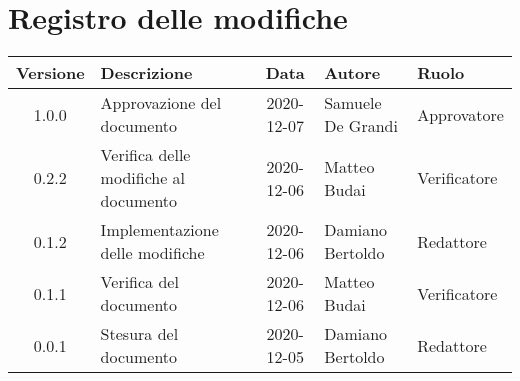 \section*{Registro delle modifiche}

\begin{center}
	\begin{longtable}{|c|p{3.5cm}|c|p{3.1cm}|p{3cm}|}
	\hline
	\rowcolor{lighter-grayer}
	\textbf{Versione} & \textbf{Descrizione} & \textbf{Data} & \textbf{Autore} & \textbf{Ruolo} \\
	\hline
	\endfirsthead

	1.0.0 & Approvazione del documento & 2020-12-07 & Samuele De Grandi & Approvatore \\
	\hline
	0.2.2 & Verifica delle modifiche al documento & 2020-12-06 & Matteo Budai & Verificatore \\
	\hline
    0.1.2 & Implementazione delle modifiche & 2020-12-06 & Damiano Bertoldo & Redattore \\
    \hline
    0.1.1 & Verifica del documento & 2020-12-06 & Matteo Budai & Verificatore \\
    \hline
    0.0.1 & Stesura del documento & 2020-12-05 & Damiano Bertoldo & Redattore \\
    \hline
	\end{longtable}
\end{center}

